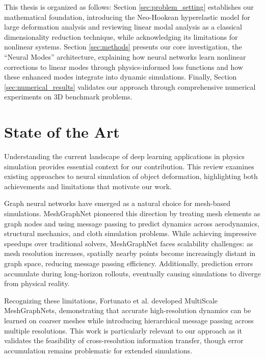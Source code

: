 This thesis is organized as follows: Section \ref{sec:problem_setting} establishes our mathematical foundation, introducing the Neo-Hookean hyperelastic model for large deformation analysis and reviewing linear modal analysis as a classical dimensionality reduction technique, while acknowledging its limitations for nonlinear systems. Section \ref{sec:methods} presents our core investigation, the ``Neural Modes'' architecture, explaining how neural networks learn nonlinear corrections to linear modes through physics-informed loss functions and how these enhanced modes integrate into dynamic simulations. Finally, Section \ref{sec:numerical_results} validates our approach through comprehensive numerical experiments on 3D benchmark problems.

\section*{State of the Art}

Understanding the current landscape of deep learning applications in physics simulation provides essential context for our contribution. This review examines existing approaches to neural simulation of object deformation, highlighting both achievements and limitations that motivate our work.

Graph neural networks have emerged as a natural choice for mesh-based simulations. MeshGraphNet \cite{pfaffLearningMeshBasedSimulation2021a} pioneered this direction by treating mesh elements as graph nodes and using message passing to predict dynamics across aerodynamics, structural mechanics, and cloth simulation problems. While achieving impressive speedups over traditional solvers, MeshGraphNet faces scalability challenges: as mesh resolution increases, spatially nearby points become increasingly distant in graph space, reducing message passing efficiency. Additionally, prediction errors accumulate during long-horizon rollouts, eventually causing simulations to diverge from physical reality.

Recognizing these limitations, Fortunato et al. \cite{fortunatoMultiScaleMeshGraphNets2022} developed MultiScale MeshGraphNets, demonstrating that accurate high-resolution dynamics can be learned on coarser meshes while introducing hierarchical message passing across multiple resolutions. This work is particularly relevant to our approach as it validates the feasibility of cross-resolution information transfer, though error accumulation remains problematic for extended simulations.

